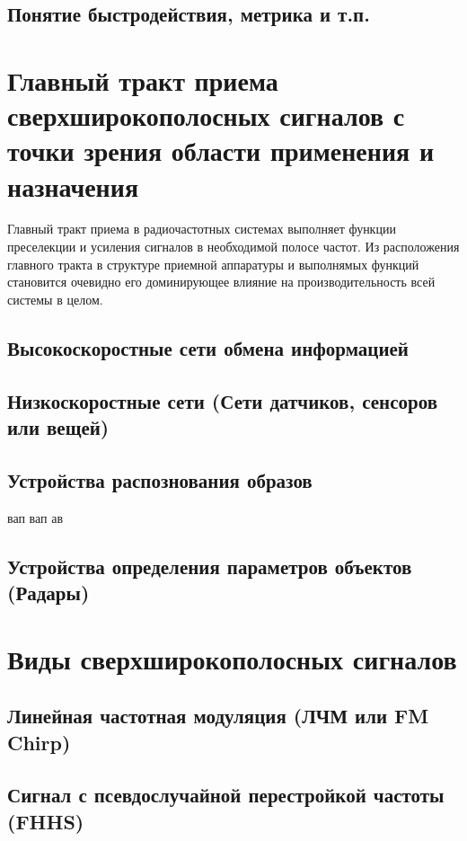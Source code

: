 \subsection{Понятие быстродействия, метрика и т.п.}

\section{Главный тракт приема сверхширокополосных сигналов с точки зрения области применения и назначения}
Главный тракт приема в радиочастотных системах выполняет функции преселекции и усиления сигналов в необходимой полосе частот. Из расположения главного тракта в структуре приемной аппаратуры и выполнямых функций становится очевидно его доминирующее влияние на производительность всей системы в целом.

\subsection{Высокоскоростные сети обмена информацией}

\subsection{Низкоскоростные сети (Сети датчиков, сенсоров или вещей)}

\subsection{Устройства распознования образов}
вап вап ав

\subsection{Устройства определения параметров объектов (Радары)}

\section{Виды сверхширокополосных сигналов}

\subsection{Линейная частотная модуляция (ЛЧМ или FM Chirp)}

\subsection{Сигнал с псевдослучайной перестройкой частоты (FHHS)}

